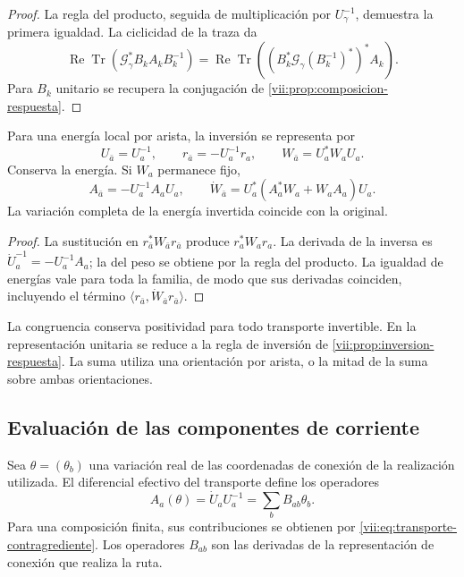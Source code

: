 \begin{proof}
La regla del producto, seguida de multiplicación por
\(U_\gamma^{-1}\), demuestra la primera igualdad. La ciclicidad
de la traza da
\[
 \operatorname{Re}\operatorname{Tr}
  (\mathcal G_\gamma^*B_kA_kB_k^{-1})
 =\operatorname{Re}\operatorname{Tr}
  ((B_k^*\mathcal G_\gamma(B_k^{-1})^*)^*A_k).
\]
Para \(B_k\) unitario se recupera la conjugación de
\ref{vii:prop:composicion-respuesta}.
\end{proof}

\begin{proposition}
\label{vii:prop:inversion-congruencia}
Para una energía local por arista, la inversión se representa por
\begin{equation}
 U_{\bar a}=U_a^{-1},\qquad
 r_{\bar a}=-U_a^{-1}r_a,\qquad
 W_{\bar a}=U_a^*W_aU_a.
 \label{vii:eq:inversion-peso-general}
\end{equation}
Conserva la energía. Si \(W_a\) permanece fijo,
\[
 A_{\bar a}=-U_a^{-1}A_aU_a,\qquad
 \dot W_{\bar a}=U_a^*(A_a^*W_a+W_aA_a)U_a.
\]
La variación completa de la energía invertida coincide con la original.
\end{proposition}

\begin{proof}
La sustitución en \(r_{\bar a}^*W_{\bar a}r_{\bar a}\)
produce \(r_a^*W_ar_a\). La derivada de la inversa es
\(\dot U_a^{-1}=-U_a^{-1}A_a\); la del peso se obtiene por
la regla del producto. La igualdad de energías vale para toda la
familia, de modo que sus derivadas coinciden, incluyendo el término
\(\langle r_{\bar a},\dot W_{\bar a}r_{\bar a}\rangle\).
\end{proof}

La congruencia conserva positividad para todo transporte invertible.
En la representación unitaria se reduce a la regla de inversión de
\ref{vii:prop:inversion-respuesta}. La suma utiliza una orientación
por arista, o la mitad de la suma sobre ambas orientaciones.

\subsection{Evaluación de las componentes de corriente}

Sea \(\theta=(\theta_b)\) una variación real de las coordenadas
de conexión de la realización utilizada. El diferencial efectivo del
transporte define los operadores
\begin{equation}
 A_a(\theta)=\dot U_aU_a^{-1}
     =\sum_bB_{ab}\theta_b.
 \label{vii:eq:diferencial-conexion-transporte}
\end{equation}
Para una composición finita, sus contribuciones se obtienen por
\eqref{vii:eq:transporte-contragrediente}. Los operadores
\(B_{ab}\) son las derivadas de la representación de conexión que
realiza la ruta.

